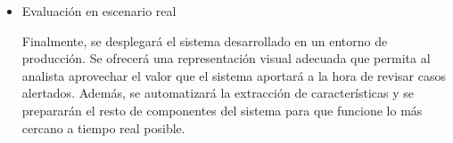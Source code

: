 \begin{itemize}
    \item Evaluación en escenario real

Finalmente, se desplegará el sistema desarrollado en un entorno de producción.
Se ofrecerá una representación visual adecuada que permita al analista aprovechar el valor que el sistema aportará a la hora de revisar casos alertados.
Además, se automatizará la extracción de características y se prepararán el resto de componentes del sistema para que funcione lo más cercano a tiempo real posible.

\end{itemize}
